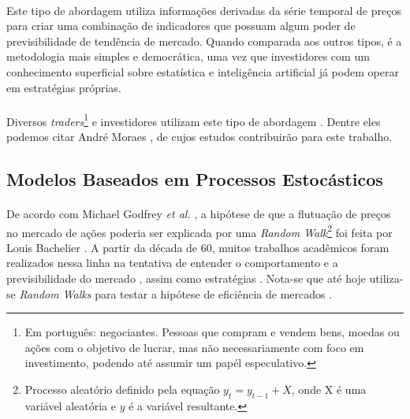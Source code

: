 \paragraph{} Este tipo de abordagem utiliza informações derivadas da série temporal de preços para criar uma combinação de indicadores que possuam algum poder de previsibilidade de tendência de mercado. Quando comparada aos outros tipos, é a metodologia mais simples e democrática, uma vez que investidores com um conhecimento superficial sobre estatística e inteligência artificial já podem operar em estratégias próprias.

\paragraph{} Diversos \textit{traders}\footnote{Em português: negociantes. Pessoas que compram e vendem bens, moedas ou ações com o objetivo de lucrar, mas não necessariamente com foco em investimento, podendo até assumir um papél especulativo.} e investidores utilizam este tipo de abordagem \cite{ijegwa2014predictive}. Dentre eles podemos citar André Moraes \cite{moraes2007se}, de cujos estudos contribuirão para este trabalho.



\FloatBarrier
\subsection{Modelos Baseados em Processos Estocásticos}

\paragraph{} De acordo com Michael Godfrey \textit{et al.} \cite{godfrey1964random}, a hipótese de que a flutuação de preços no mercado de ações poderia ser explicada por uma \textit{Random Walk}\footnote{Processo aleatório definido pela equação \begin{math}y_t = y_{t-1} + X\end{math}, onde X é uma variável aleatória e \(y\) é a variável resultante.} foi feita por Louis Bachelier \cite{bachelier1900theorie}. A partir da década de 60, muitos trabalhos acadêmicos foram realizados nessa linha na tentativa de entender o comportamento e a previsibilidade do mercado \cite{fama1970efficient, solnik1973note, cooper1982world}, assim como estratégias \cite{malkiel2019random}. Nota-se que até hoje utiliza-se \textit{Random Walks} para testar a hipótese de eficiência de mercados \cite{said2015efficiency}.


